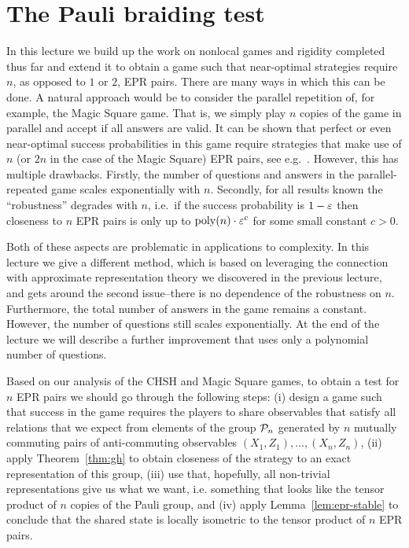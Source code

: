 
\chapter{The Pauli braiding test}

In this lecture we build up the work on nonlocal games and rigidity completed thus far and extend it to obtain a game such that near-optimal strategies require $n$, as opposed to $1$ or $2$, EPR pairs. There are many ways in which this can be done. A natural approach would be to consider the parallel repetition of, for example, the Magic Square game. That is, we simply play $n$ copies of the game in parallel and accept if all answers are valid. It can be shown that perfect or even near-optimal success probabilities in this game require strategies that make use of $n$ (or $2n$ in the case of the Magic Square) EPR pairs, see e.g.~\cite{coudron2016parallel}. However, this has multiple drawbacks. Firstly, the number of questions and answers in the parallel-repeated game scales exponentially with $n$. Secondly, for all results known the ``robustness'' degrades with $n$, i.e.\ if the success probability is $1-\varepsilon$ then closeness to $n$ EPR pairs is only up to $\operatorname{poly}(n)\cdot \varepsilon^c$ for some small constant $c>0$. 

Both of these aspects are problematic in applications to complexity. In this lecture we give a different method, which is based on leveraging the connection with approximate representation theory we discovered in the previous lecture, and gets around the second issue--there is no dependence of the robustness on $n$. Furthermore, the total number of answers in the game remains a constant. However, the number of questions still scales exponentially. At the end of the lecture we will describe a further improvement that uses only a polynomial number of questions. 

Based on our analysis of the CHSH and Magic Square games, to obtain a test for $n$ EPR pairs we should go through the following steps: (i) design a game such that success in the game requires the players to share observables that satisfy all relations that we expect from elements of the group $\mathcal{P}_n$ generated by $n$ mutually commuting pairs of anti-commuting observables $(X_1,Z_1),\ldots,(X_n,Z_n)$, (ii) apply Theorem~\ref{thm:gh} to obtain closeness of the strategy to an exact representation of this group, (iii) use that, hopefully, all non-trivial representations give us what we want, i.e. something that looks like the tensor product of $n$ copies of the Pauli group, and (iv) apply Lemma~\ref{lem:epr-stable} to conclude that the shared state is locally isometric to the tensor product of $n$ EPR pairs. 

